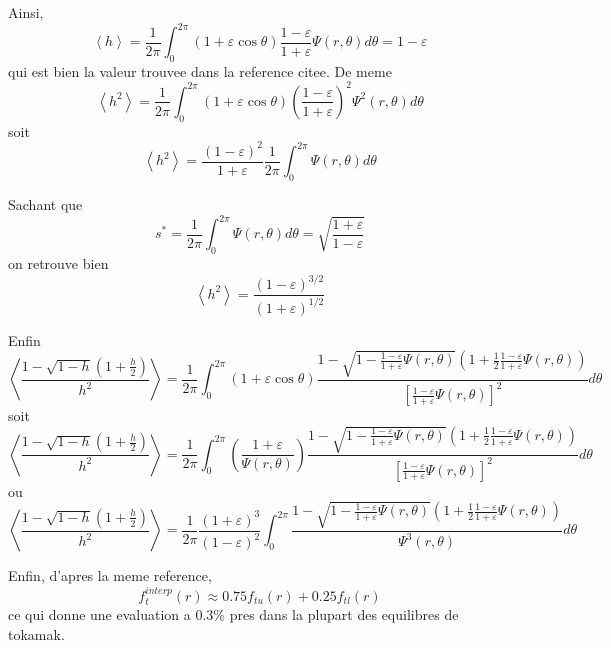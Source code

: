Ainsi, \[
\left\langle h\right\rangle =\frac{1}{2\pi}\int_{0}^{2\pi}\left(1+\varepsilon\cos\theta\right)\frac{1-\varepsilon}{1+\varepsilon}\Psi\left(r,\theta\right)d\theta=1-\varepsilon\]
 qui est bien la valeur trouvee dans la reference citee. De meme \[
\left\langle h^{2}\right\rangle =\frac{1}{2\pi}\int_{0}^{2\pi}\left(1+\varepsilon\cos\theta\right)\left(\frac{1-\varepsilon}{1+\varepsilon}\right)^{2}\Psi^{2}\left(r,\theta\right)d\theta\]
 soit \[
\left\langle h^{2}\right\rangle =\frac{\left(1-\varepsilon\right)^{2}}{1+\varepsilon}\frac{1}{2\pi}\int_{0}^{2\pi}\Psi\left(r,\theta\right)d\theta\]


Sachant que \[
s^{*}=\frac{1}{2\pi}\int_{0}^{2\pi}\Psi\left(r,\theta\right)d\theta=\sqrt{\frac{1+\varepsilon}{1-\varepsilon}}\]
 on retrouve bien \[
\left\langle h^{2}\right\rangle =\frac{\left(1-\varepsilon\right)^{3/2}}{\left(1+\varepsilon\right)^{1/2}}\]


Enfin \[
\left\langle \frac{1-\sqrt{1-h}\left(1+\frac{h}{2}\right)}{h^{2}}\right\rangle =\frac{1}{2\pi}\int_{0}^{2\pi}\left(1+\varepsilon\cos\theta\right)\frac{1-\sqrt{1-\frac{1-\varepsilon}{1+\varepsilon}\Psi\left(r,\theta\right)}\left(1+\frac{1}{2}\frac{1-\varepsilon}{1+\varepsilon}\Psi\left(r,\theta\right)\right)}{\left[\frac{1-\varepsilon}{1+\varepsilon}\Psi\left(r,\theta\right)\right]^{2}}d\theta\]
 soit \[
\left\langle \frac{1-\sqrt{1-h}\left(1+\frac{h}{2}\right)}{h^{2}}\right\rangle =\frac{1}{2\pi}\int_{0}^{2\pi}\left(\frac{1+\varepsilon}{\Psi\left(r,\theta\right)}\right)\frac{1-\sqrt{1-\frac{1-\varepsilon}{1+\varepsilon}\Psi\left(r,\theta\right)}\left(1+\frac{1}{2}\frac{1-\varepsilon}{1+\varepsilon}\Psi\left(r,\theta\right)\right)}{\left[\frac{1-\varepsilon}{1+\varepsilon}\Psi\left(r,\theta\right)\right]^{2}}d\theta\]
 ou \[
\left\langle \frac{1-\sqrt{1-h}\left(1+\frac{h}{2}\right)}{h^{2}}\right\rangle =\frac{1}{2\pi}\frac{\left(1+\varepsilon\right)^{3}}{\left(1-\varepsilon\right)^{2}}\int_{0}^{2\pi}\frac{1-\sqrt{1-\frac{1-\varepsilon}{1+\varepsilon}\Psi\left(r,\theta\right)}\left(1+\frac{1}{2}\frac{1-\varepsilon}{1+\varepsilon}\Psi\left(r,\theta\right)\right)}{\Psi^{3}\left(r,\theta\right)}d\theta\]


Enfin, d'apres la meme reference, \[
f_{t}^{interp}\left(r\right)\approx0.75f_{tu}\left(r\right)+0.25f_{tl}\left(r\right)\]
 ce qui donne une evaluation a 0.3\% pres dans la plupart des equilibres
de tokamak.
